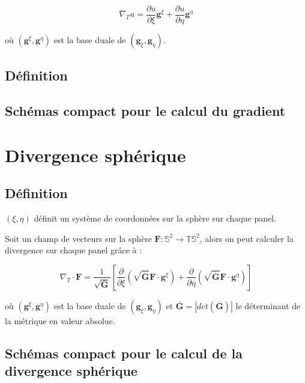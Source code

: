 \begin{equation}
\label{eq:gradCS}
\nabla_T u = \dfrac{\partial u}{\partial \xi} \mathbf{g}^{\xi} + \dfrac{\partial u}{\partial \eta} \mathbf{g}^{\eta}
\end{equation}

où $( \mathbf{g}^{\xi}, \mathbf{g}^{\eta})$ est la base duale de $( \mathbf{g}_{\xi}, \mathbf{g}_{\eta})$.

\subsection{Définition}

\subsection{Schémas compact pour le calcul du gradient}

\section{Divergence sphérique}

\subsection{Définition}

$(\xi, \eta)$ définit un système de coordonnées sur la sphère sur chaque panel.

Soit un champ de vecteurs sur la sphère $\mathbf{F} :  \mathbb{S}^2 \longrightarrow \mathbb{TS}^2$, alors on peut calculer la divergence sur chaque panel grâce à :

\begin{equation}
\label{eq:divCS}
\nabla_T \cdot \mathbf{F} = \dfrac{1}{\sqrt{\overline{\mathbf{G}}}} \left[  \dfrac{\partial}{\partial \xi} \left( \sqrt{\overline{\mathbf{G}}} \mathbf{F} \cdot \mathbf{g}^{\xi} \right) + \dfrac{\partial}{\partial \eta} \left( \sqrt{\overline{\mathbf{G}}} \mathbf{F} \cdot \mathbf{g}^{\eta} \right)  \right]
\end{equation}

où $( \mathbf{g}^{\xi}, \mathbf{g}^{\eta})$ est la base duale de $( \mathbf{g}_{\xi}, \mathbf{g}_{\eta})$ et $\overline{\mathbf{G}} = |det \left( \overline{\mathbf{G}} \right)|$ le déterminant de la métrique en valeur absolue.

\subsection{Schémas compact pour le calcul de la divergence sphérique}

